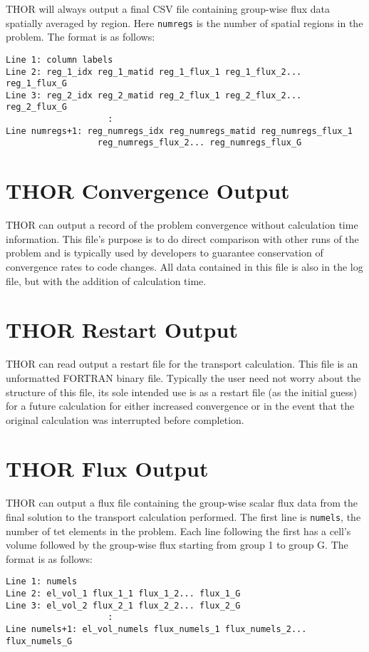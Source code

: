 THOR will always output a final CSV file containing group-wise flux data spatially averaged by region.
Here \verb"numregs" is the number of spatial regions in the problem.
The format is as follows:
\begin{verbatim}
Line 1: column labels
Line 2: reg_1_idx reg_1_matid reg_1_flux_1 reg_1_flux_2... reg_1_flux_G
Line 3: reg_2_idx reg_2_matid reg_2_flux_1 reg_2_flux_2... reg_2_flux_G
                    :
Line numregs+1: reg_numregs_idx reg_numregs_matid reg_numregs_flux_1
                  reg_numregs_flux_2... reg_numregs_flux_G
\end{verbatim}

\section{THOR Convergence Output}\label{ch:out:sec:conv}

THOR can output a record of the problem convergence without calculation time information.
This file's purpose is to do direct comparison with other runs of the problem and is typically used by developers to guarantee conservation of convergence rates to code changes.
All data contained in this file is also in the log file, but with the addition of calculation time.

\section{THOR Restart Output}\label{ch:out:sec:restart}

THOR can read output a restart file for the transport calculation.
This file is an unformatted FORTRAN binary file.
Typically the user need not worry about the structure of this file, its sole intended use is as a restart file (as the initial guess) for a future calculation for either increased convergence or in the event that the original calculation was interrupted before completion.

\section{THOR Flux Output}\label{ch:out:sec:flux}

THOR can output a flux file containing the group-wise scalar flux data from the final solution to the transport calculation performed.
The first line is \verb"numels", the number of tet elements in the problem.
Each line following the first has a cell's volume followed by the group-wise flux starting from group 1 to group G.
The format is as follows:
\begin{verbatim}
Line 1: numels
Line 2: el_vol_1 flux_1_1 flux_1_2... flux_1_G
Line 3: el_vol_2 flux_2_1 flux_2_2... flux_2_G
                    :
Line numels+1: el_vol_numels flux_numels_1 flux_numels_2... flux_numels_G
\end{verbatim}

